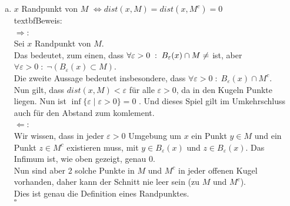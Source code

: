 \documentclass[11pt,a4paper,ngerman]{article}
\begin{document}
\begin{enumerate}[(i)]
\begin{enumerate}[a)]
				\item $x$ Randpunkt von $M$ $\Longleftrightarrow dist(x,M) = dist(x,M^c) = 0$\\
				textbf{Beweis:}\\
					$\Rightarrow$:\\
                        Sei $x$ Randpunkt von $M$.\\
                        Das bedeutet, zum einen, dass $\forall \varepsilon > 0 \; : \; B_\varepsilon(x)
                        \cap M \not= \empty$ ist, aber $\forall \varepsilon > 0 \; : \; \neg (B_\varepsilon(x)
                        \subset M )$.\\
                        Die zweite Aussage bedeutet insbesondere, dass $\forall \varepsilon > 0 \; : \;
                        B_\varepsilon(x) \cap M^c$.\\
                        Nun gilt, dass $dist (x,M) < \varepsilon$ für alle $\varepsilon > 0$, da in
                        den Kugeln Punkte liegen. Nun ist $\inf \{ \varepsilon \; | \; \varepsilon > 0 \} = 0$
                        . Und dieses Spiel gilt im Umkehrschluss auch für den Abstand zum komlement.\\

                    $\Leftarrow$:\\ 
                        Wir wissen, dass in jeder $\varepsilon > 0$ Umgebung um $x$ ein Punkt $y \in M$ und
                        ein Punkt $z \in M^c$ existieren muss, mit $y \in B_\varepsilon(x)$ und
                        $z \in B_\varepsilon(x)$. Das Infimum ist, wie oben gezeigt, genau 0.\\
                        Nun sind aber 2 solche Punkte in $M$ und $M^c$ in jeder offenen Kugel vorhanden,
                        daher kann der Schnitt nie leer sein (zu $M$ und $M^c$).\\
                        Dies ist genau die Definition eines Randpunktes.\\
                        \mbox{} \hfill $\square$
			\end{enumerate}
		

\end{enumerate}
\end{document}
